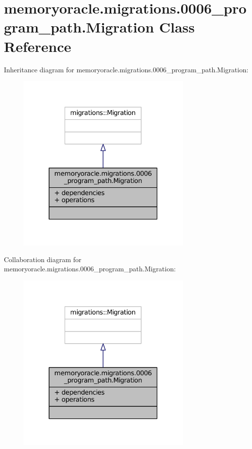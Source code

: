 \hypertarget{classmemoryoracle_1_1migrations_1_10006__program__path_1_1Migration}{}\section{memoryoracle.\+migrations.0006\+\_\+program\+\_\+path.Migration Class Reference}
\label{classmemoryoracle_1_1migrations_1_10006__program__path_1_1Migration}


Inheritance diagram for memoryoracle.\+migrations.0006\+\_\+program\+\_\+path.Migration\+:\nopagebreak
\begin{figure}[H]
\begin{center}
\leavevmode
\includegraphics[width=247pt]{classmemoryoracle_1_1migrations_1_10006__program__path_1_1Migration__inherit__graph}
\end{center}
\end{figure}


Collaboration diagram for memoryoracle.\+migrations.0006\+\_\+program\+\_\+path.Migration\+:\nopagebreak
\begin{figure}[H]
\begin{center}
\leavevmode
\includegraphics[width=247pt]{classmemoryoracle_1_1migrations_1_10006__program__path_1_1Migration__coll__graph}
\end{center}
\end{figure}
